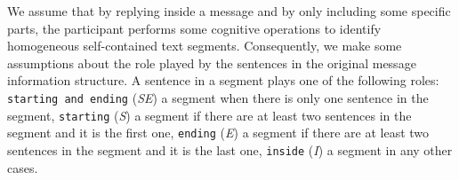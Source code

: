 We assume that by replying inside a message and by only including some specific parts, the participant performs some cognitive operations to identify homogeneous self-contained text segments.
Consequently, we make some assumptions about the role played by the sentences in the original message information structure.
%
A sentence in a segment plays one of the following roles: %
\texttt{\footnotesize starting and ending} (\textit{SE}) a segment when there is only one sentence in the segment, %
\texttt{\footnotesize starting} (\textit{S}) a segment if there are at least two sentences in the segment and it is the first one, %
 \texttt{\footnotesize ending} (\textit{E}) a segment if there are at least two sentences in the segment and it is the last one, %
\texttt{\footnotesize inside} (\textit{I}) a segment in any other cases.
%



